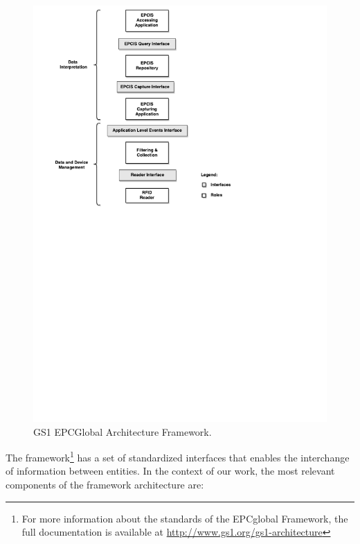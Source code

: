 \begin{figure}[ht!]
  \centering
  \includegraphics[width=.7\textwidth]{./images/EPCGlobal_architecture}
  \caption[EPCGlobal Architecture Framework.]{GS1 EPCGlobal Architecture Framework.}
  \label{fig:epc_architecture}
\end{figure}

The framework\footnote{For more information about the standards of the EPCglobal Framework, the
full documentation is available at \url{http://www.gs1.org/gs1-architecture}} has a
set of standardized interfaces that enables the interchange of information between entities. In the
context of our work, the most relevant components of the framework architecture are:

